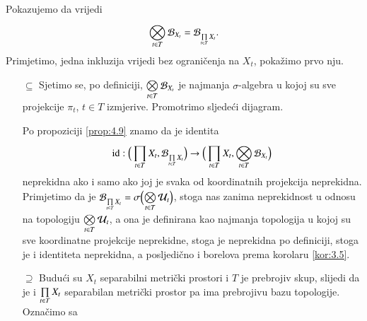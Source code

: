 \begin{rj}[\ref{zad:4.4}]
    Pokazujemo da vrijedi
    \begin{equation*}
        \bigotimes\limits_{t \in T}^{} \mathcal{B}_{X_t} = \mathcal{B}_{\prod\limits_{t \in T}^{} X_t}.
    \end{equation*}
    Primjetimo, jedna inkluzija vrijedi bez ograni\v cenja na $X_t$, poka\v zimo prvo nju.
    \begin{enumerate}
        \item[$\subseteq$]
        Sjetimo se, po definiciji, $\bigotimes\limits_{t \in T}^{} \mathcal{B}_{X_t}$ je najmanja $\sigma$-algebra u kojoj su sve projekcije $\pi_t$, $t \in T$ izmjerive.
        Promotrimo sljede\' ci dijagram.
        \begin{figure}[H]
            \centering
        \end{figure}
        Po propoziciji \ref{prop:4.9} znamo da je identita
        \begin{equation*}
            \mathrm{id} : \Big( \prod\limits_{t \in T}^{} X_t, \mathcal{B}_{\prod\limits_{t \in T}^{} X_t} \Big) \to \Big( \prod\limits_{t \in T}^{} X_t,  \bigotimes\limits_{t \in T}^{} \mathcal{B}_{X_t} \Big)
        \end{equation*}
        neprekidna ako i samo ako joj je svaka od koordinatnih projekcija neprekidna.
        Primjetimo da je $\mathcal{B}_{\prod\limits_{t \in T}^{} X_t} = \sigma \Big( {\bigotimes\limits_{t \in T}^{} \mathcal{U}_t} \Big)$, stoga nas zanima neprekidnost u odnosu na topologiju $\bigotimes\limits_{t \in T}^{} \mathcal{U}_t$, a ona je definirana kao najmanja topologija u kojoj su sve koordinatne projekcije neprekidne, stoga je neprekidna po definiciji, stoga je i identiteta neprekidna, a posljedi\v cno i borelova prema korolaru \ref{kor:3.5}.
        \item[$\supseteq$]
        Budu\' ci su $X_t$ separabilni metri\v cki prostori i $T$ je prebrojiv skup, slijedi da je i $\prod\limits_{t \in T}^{} X_t$ separabilan metri\v cki prostor pa ima prebrojivu bazu topologije. Ozna\v cimo sa

\end{enumerate}
\end{rj}

